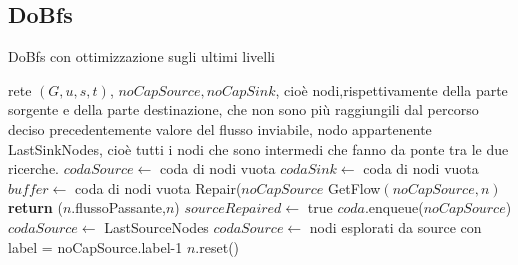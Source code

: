 \documentclass{article}
\begin{document}
\subsection{DoBfs}
\begin{algorithm}
    \caption{DoBfs con ottimizzazione sugli ultimi livelli}
    \begin{algorithmic}[1]
        \REQUIRE rete $(G,u,s,t)$, $noCapSource, noCapSink$, cioè nodi,rispettivamente della parte sorgente e della parte destinazione, che non sono più raggiungili dal percorso deciso precedentemente
        \ENSURE valore del flusso inviabile, nodo appartenente LastSinkNodes, cioè tutti i nodi che sono intermedi che fanno da ponte tra le due ricerche.
        \STATE $codaSource \leftarrow$ coda di nodi vuota
        \STATE $codaSink \leftarrow$ coda di nodi vuota
        \STATE $buffer \leftarrow$ coda di nodi vuota
        \STATE Repair($noCapSource$
        \STATE GetFlow$(noCapSource,n)$ 
        \STATE \textbf{return} ($n$.flussoPassante,$n$)
        \ENDIF
        \ENDFOR
        \ELSE
        \STATE $sourceRepaired \leftarrow$ true
        \ENDIF
        \ENDIF
        \STATE $coda.$enqueue($noCapSource$)
        \STATE $codaSource \leftarrow$ LastSourceNodes 
        \ELSE
        \STATE $codaSource \leftarrow$ nodi esplorati da source con label = noCapSource.label-1
        \STATE $n.$reset()
        \ENDFOR
        \ENDIF
        \ENDIF

    \end{algorithmic}
\end{algorithm}

\newpage
\end{document}
